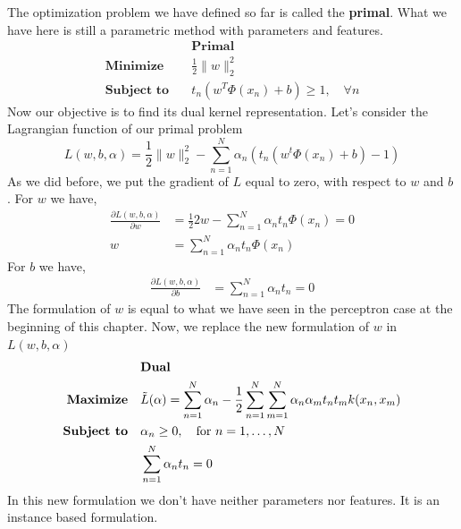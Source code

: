 \documentclass[main.tex]{subfiles}
\begin{document}
The optimization problem we have defined so far is called the \textbf{primal}. What we have here is still a parametric method with parameters and features.
\begin{align*}
                              & \textbf{Primal}                                 \\
    \textbf{Minimize} \quad   & \frac{1}{2} \|w\|_2^2                           \\
    \textbf{Subject to} \quad & t_n (w^T \Phi(x_n) + b) \geq 1, \quad \forall n
\end{align*}
Now our objective is to find its dual kernel representation.
Let's consider the Lagrangian function of our primal problem\footnotemark {}
\begin{equation}
    L(w,b,\alpha) = \frac{1}{2} \|w\|_2^2 - \sum_{n=1}^N \alpha_n (t_n(w^t \Phi(x_n) + b) - 1)
\end{equation}
\newpage
As we did before, we put the gradient of $L$ equal to zero, with respect to $w$ and $b$ \footnotemark. 
\newline
For $w$ we have,
\begin{align*}
    \frac{\partial L(w,b,\alpha)}{\partial w} & = \frac{1}{2} 2w - \sum_{n=1}^N \alpha_n t_n \Phi(x_n) = 0 \\
    w                                         & = \sum_{n=1}^N \alpha_n t_n \Phi(x_n)
\end{align*}
For $b$ we have,
\begin{align*}
    \frac{\partial L(w,b,\alpha)}{\partial b} & = \sum_{n=1}^N \alpha_n t_n = 0
\end{align*}
The formulation of $w$ is equal to what we have seen in the perceptron case at the beginning of this chapter. Now, we replace the new formulation of $w$ in $L(w,b,\alpha)$
\begin{align*}
                              & \textbf{Dual}                                                                                                         \\
    \textbf{Maximize} \quad   & \Tilde{L}(\alpha) = \sum_{n=1}^N \alpha_n - \frac{1}{2}\sum_{n=1}^N \sum_{m=1}^N \alpha_n \alpha_m t_n t_m k(x_n,x_m) \\
    \textbf{Subject to} \quad & \alpha_n \geq 0, \quad \text{for } n=1, \dots, N                                                                      \\
                              & \sum_{n=1}^N \alpha_n t_n = 0
\end{align*}
In this new formulation we don't have neither parameters nor features. It is an instance based formulation.
\end{document}
